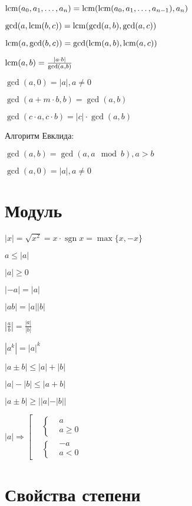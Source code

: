 $\operatorname{lcm}(a_0, a_1, \dots, a_n) = \operatorname{lcm}(\operatorname{lcm}(a_0, a_1, \dots, a_{n-1}), a_n)$


$\gcd(a, \operatorname{lcm}(b, c)) = \operatorname{lcm}(\gcd(a, b), \gcd(a, c))$

$\operatorname{lcm}(a, \gcd(b, c)) = \gcd(\operatorname{lcm}(a, b), \operatorname{lcm}(a, c))$


$\operatorname{lcm}(a, b) = \frac{|a\cdot b|}{\gcd(a, b)}$

$\gcd(a, 0)=|a|, a \neq 0$

$\gcd(a + m\cdot b, b) = \gcd(a, b)$

$\gcd(c\cdot a, c\cdot b) = |c|\cdot\gcd(a, b)$

Алгоритм Евклида:

$\gcd(a, b) = \gcd(a, a \mod b), a > b$

$\gcd(a, 0)=|a|, a \neq 0$

\section{Модуль}

$ |x| = \sqrt{x^2} = x \cdot \mathop{\text{sgn}} x = \max \{x, -x\} $

$ a \leqslant |a| $

$ |a| \geqslant 0 $

$ |-a| = |a| $

$ |ab| = |a| |b| $

$ \left|\frac{a}{b}\right| = \frac{|a|}{|b|} $

$ |a^k| = |a|^k $

$ |a\pm b| \leqslant |a| + |b| $

$ |a| - |b| \leqslant |a+b| $

$ |a\pm b| \geqslant ||a| - |b|| $

$ |a| \Rightarrow \left[ \begin{aligned}
	& \left\{ \begin{aligned}
		& a \\
		& a \geqslant 0
	\end{aligned}\right. \\
	& \left\{ \begin{aligned}
		& -a \\
		& a < 0
	\end{aligned}\right.
\end{aligned}\right. $


\section{Свойства степени}

